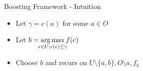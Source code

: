 \begin{frame}{Boosting Framework - Intuition}
        \begin{itemize}
            \item Let $\gamma = c(a)$ for some $a \in O$
            \item Let $b = \displaystyle{\argmax_{\mathclap{e \in U : c(e) \leq \gamma}} f(e)}$
            \item Choose $b$ and recurs on $U \setminus \{a, b\}, O \setminus a, f_b$
        \end{itemize}
\end{frame}